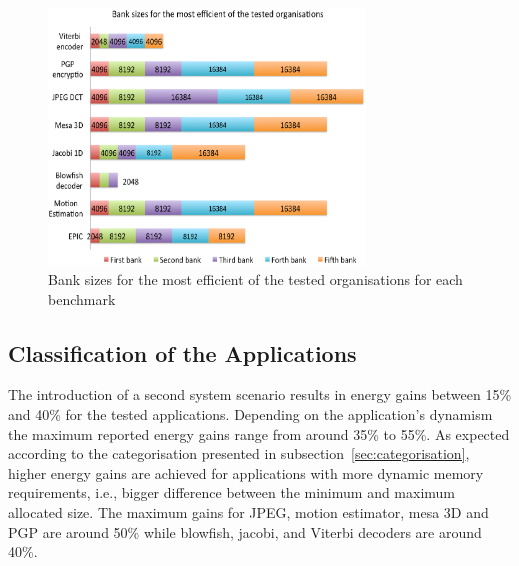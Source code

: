 \documentclass[smallextended]{svjour3}
\begin{document}
\begin{figure}
\centering
\includegraphics[width=0.75\textwidth]{Images/banks2.eps}
\caption{Bank sizes for the most efficient of the tested organisations for each benchmark}
\label{fig:banks}
\end{figure}

\subsection{Classification of the Applications}

The introduction of a second system scenario results in energy gains between 15\% and  40\%  for the tested applications. 
Depending on the application's dynamism the maximum reported energy gains range from around 35\% to 55\%. 
As expected according to the categorisation presented in subsection~\ref{sec:categorisation}, higher energy gains are achieved for applications with more dynamic memory requirements, i.e., bigger difference between the minimum and maximum allocated size. 
The maximum gains for JPEG, motion estimator, mesa 3D and PGP are around 50\% while blowfish, jacobi, and Viterbi decoders are around 40\%.
\end{document}
